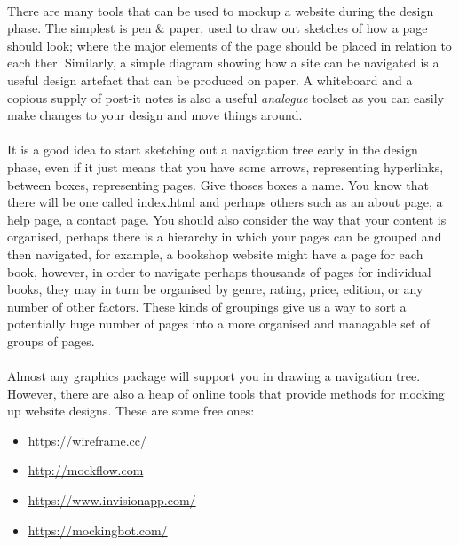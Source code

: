\documentclass[10pt, a4paper]{article}
\begin{document}
\paragraph{} There are many tools that can be used to mockup a website during the design phase. The simplest is pen \& paper, used to draw out sketches of how a page should look; where the major elements of the page should be placed in relation to each ther. Similarly, a simple diagram showing how a site can be navigated is a useful design artefact that can be produced on paper. A whiteboard and a copious supply of post-it notes is also a useful \emph{analogue} toolset as you can easily make changes to your design and move things around.

\paragraph{} It is a good idea to start sketching out a navigation tree early in the design phase, even if it just means that you have some arrows, representing hyperlinks, between boxes, representing pages. Give thoses boxes a name. You know that there will be one called index.html and perhaps others such as an about page, a help page, a contact page. You should also consider the way that your content is organised, perhaps there is a hierarchy in which your pages can be grouped and then navigated, for example, a bookshop website might have a page for each book, however, in order to navigate perhaps thousands of pages for individual books, they may in turn be organised by genre, rating, price, edition, or any number of other factors. These kinds of groupings give us a way to sort a potentially huge number of pages into a more organised and managable set of groups of pages.


\paragraph{} Almost any graphics package will support you in drawing a navigation tree. However, there are also a heap of online tools that provide methods for mocking up website designs. These are some free ones:

\begin{itemize}
\item \url{https://wireframe.cc/}
\item \url{http://mockflow.com}
\item \url{https://www.invisionapp.com/}
\item \url{https://mockingbot.com/}
\end{itemize}
\end{document}
